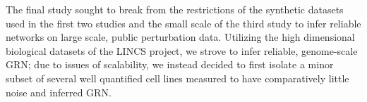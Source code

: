 \begin{abstracts}
The final study sought to break from the restrictions of the synthetic datasets used in the first two studies and the small scale of the third study to infer reliable networks on large scale, public perturbation data. Utilizing the high dimensional biological datasets of the LINCS project, we strove to infer reliable, genome-scale GRN; due to issues of scalability, we instead decided to first isolate a minor subset of several well quantified cell lines measured to have comparatively little noise and inferred GRN.%



\end{abstracts}

